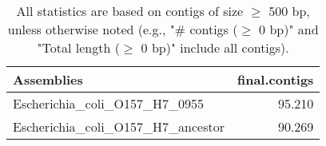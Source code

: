 \documentclass[12pt,a4paper]{article}
\begin{document}
\begin{table}[ht]
\begin{center}
\caption{All statistics are based on contigs of size $\geq$ 500 bp, unless otherwise noted (e.g., "\# contigs ($\geq$ 0 bp)" and "Total length ($\geq$ 0 bp)" include all contigs).}
\begin{tabular}{|l*{1}{|r}|}
\hline
Assemblies & final.contigs \\ \hline
Escherichia\_coli\_O157\_H7\_0955 & 95.210 \\ \hline
Escherichia\_coli\_O157\_H7\_ancestor & 90.269 \\ \hline
\end{tabular}
\end{center}
\end{table}
\end{document}
